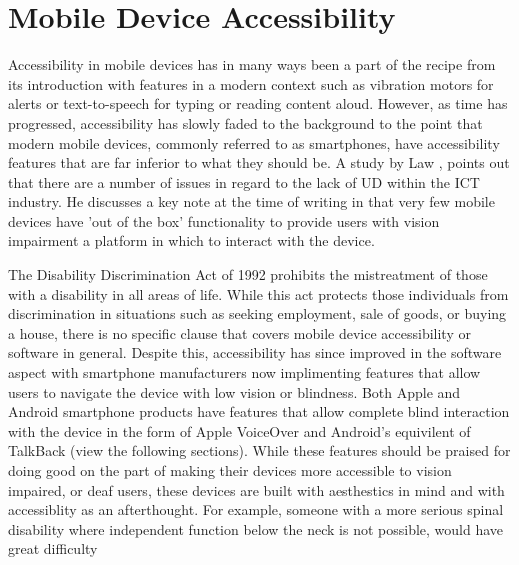 
\section{Mobile Device Accessibility}
Accessibility in mobile devices has in many ways been a part of the recipe from its introduction with features in a modern context such as vibration motors for alerts or text-to-speech for typing or reading content aloud.
However, as time has progressed, accessibility has slowly faded to the background to the point that modern mobile devices, commonly referred to as smartphones, have accessibility features that are far inferior to what they should be. %
A study by Law \cite{cellphone}, points out that there are a number of issues in regard to the lack of UD within the ICT industry. %
He discusses a key note at the time of writing in that very few mobile devices have 'out of the box' functionality to provide users with vision impairment a platform in which to interact with the device. %

The Disability Discrimination Act of 1992\cite{dda1992} prohibits the mistreatment of those with a disability in all areas of life.
While this act protects those individuals from discrimination in situations such as seeking employment, sale of goods, or buying a house, there is no specific clause that covers mobile device accessibility or software in general.
Despite this, accessibility has since improved in the software aspect with smartphone manufacturers now implimenting features that allow users to navigate the device with low vision or blindness.
Both Apple and Android smartphone products have features that allow complete blind interaction with the device in the form of Apple VoiceOver \cite{iphone} and Android's equivilent of TalkBack \cite{android} (view the following sections).
While these features should be praised for doing good on the part of making their devices more accessible to vision impaired, or deaf users, these devices are built with aesthestics in mind and with accessiblity as an afterthought.
For example, someone with a more serious spinal disability where independent function below the neck is not possible, would have great difficulty 

